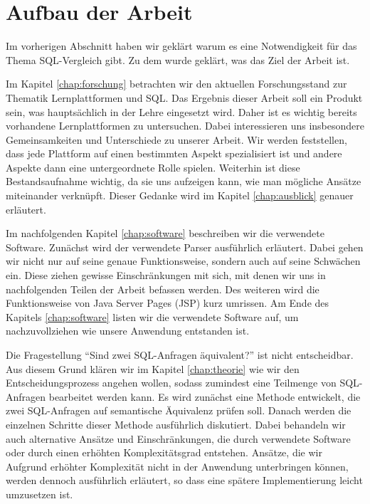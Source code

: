 \section{Aufbau der Arbeit}

Im vorherigen Abschnitt haben wir geklärt warum es eine Notwendigkeit für das Thema SQL-Vergleich gibt. Zu dem wurde geklärt, was das Ziel der Arbeit ist. 

Im Kapitel \ref{chap:forschung} betrachten wir den aktuellen Forschungsstand zur Thematik Lernplattformen und SQL. Das Ergebnis dieser Arbeit soll ein Produkt sein, was hauptsächlich in der Lehre eingesetzt wird. Daher ist es wichtig bereits vorhandene Lernplattformen zu untersuchen. Dabei interessieren uns insbesondere Gemeinsamkeiten und Unterschiede zu unserer Arbeit. Wir werden feststellen, dass jede Plattform auf einen bestimmten Aspekt spezialisiert ist und andere Aspekte dann eine untergeordnete Rolle spielen. Weiterhin ist diese Bestandsaufnahme wichtig, da sie uns aufzeigen kann, wie man mögliche Ansätze miteinander verknüpft. Dieser Gedanke wird im Kapitel \ref{chap:ausblick} genauer erläutert.

Im nachfolgenden Kapitel \ref{chap:software} beschreiben wir die verwendete Software. Zunächst wird der verwendete Parser ausführlich erläutert. Dabei gehen wir nicht nur auf seine genaue Funktionsweise, sondern auch auf seine Schwächen ein. Diese ziehen gewisse Einschränkungen mit sich, mit denen wir uns in nachfolgenden Teilen der Arbeit befassen werden. Des weiteren wird die Funktionsweise von Java Server Pages (JSP) kurz umrissen. Am Ende des Kapitels \ref{chap:software} listen wir die verwendete Software auf, um nachzuvollziehen wie unsere Anwendung entstanden ist.

Die Fragestellung ``Sind zwei SQL-Anfragen äquivalent?'' ist nicht entscheidbar. Aus diesem Grund klären wir im Kapitel \ref{chap:theorie} wie wir den Entscheidungsprozess angehen wollen, sodass zumindest eine Teilmenge von SQL-Anfragen bearbeitet werden kann. Es wird zunächst eine Methode entwickelt, die zwei SQL-Anfragen auf semantische Äquivalenz prüfen soll. Danach werden die einzelnen Schritte dieser Methode ausführlich diskutiert. Dabei behandeln wir auch alternative Ansätze und Einschränkungen, die durch verwendete Software oder durch einen erhöhten Komplexitätsgrad entstehen. Ansätze, die wir Aufgrund erhöhter Komplexität nicht in der Anwendung unterbringen können, werden dennoch ausführlich erläutert, so dass eine spätere Implementierung leicht umzusetzen ist.

